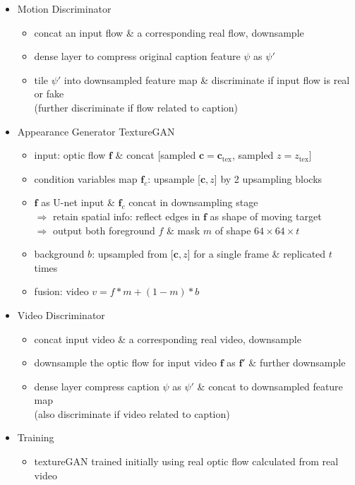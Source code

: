 \begin{itemize}
\begin{itemize}
\begin{itemize}
		\end{itemize}
	\item Motion Discriminator
		\begin{itemize}
		\item concat an input flow \& a corresponding real flow, downsample
		\item dense layer to compress original caption feature $\psi$ as $\psi'$
		\item tile $\psi'$ into downsampled feature map \& discriminate if input flow is real or fake \\
		(further discriminate if flow related to caption)
		\end{itemize}
	\item Appearance Generator TextureGAN
		\begin{itemize}
		\item input: optic flow $\mathbf f$ \& concat [sampled $\mathbf c=\mathbf c_\text{tex}$, sampled $z=z_\text{tex}$]
		\item condition variables map $\mathbf f_c$: upsample [$\mathbf c, z$] by 2 upsampling blocks
		\item $\mathbf f$ as U-net input \& $\mathbf f_c$ concat in downsampling stage \\
		$\Rightarrow$ retain spatial info: reflect edges in $\mathbf f$ as shape of moving target \\
		$\Rightarrow$ output both foreground $f$ \& mask $m$ of shape $64\times64\times t$
		\item background $b$: upsampled from [$\mathbf c, z$] for a single frame \& replicated $t$ times
		\item fusion: video $v = f*m + (1-m)*b$
		\end{itemize}
	\item Video Discriminator
		\begin{itemize}
		\item concat input video \& a corresponding real video, downsample
		\item downsample the optic flow for input video $\mathbf f$ as $\mathbf f'$ \& further downsample
		\item dense layer compress caption $\psi$ as $\psi'$ \& concat to downsampled feature map \\
		(also discriminate if video related to caption)
		\end{itemize}
	\item Training
		\begin{itemize}
		\item textureGAN trained initially using real optic flow calculated from real video \\

\end{itemize}
\end{itemize}
\end{itemize}

